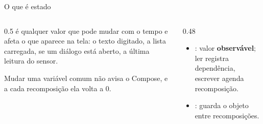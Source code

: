 \documentclass[aspectratio=169,10pt]{beamer}
\begin{document}
\begin{frame}[fragile]{O que é estado}
  \begin{columns}[T]
    \begin{column}{0.5\textwidth}
      \small
       é qualquer valor que pode mudar com o tempo e afeta o que aparece na tela: o texto digitado, a lista carregada, se um diálogo está aberto, a última leitura do sensor.
      \begin{erro}
        Mudar uma variável comum não avisa o Compose, e a cada recomposição ela volta a 0.
      \end{erro}
    \end{column}
    \begin{column}{0.48\textwidth}
      \begin{conceito}
        \begin{itemize}
          \item {}: valor \textbf{observável}; ler registra dependência, escrever agenda recomposição.
          \item {}: guarda o objeto entre recomposições.
        \end{itemize}
      \end{conceito}
    \end{column}
  \end{columns}
\end{frame}
\end{document}
